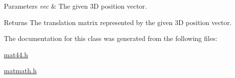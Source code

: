 \begin{DoxyParams}{Parameters}
{\em vec} & The given 3\+D position vector.\\
\hline
\end{DoxyParams}
\begin{DoxyReturn}{Returns}
The translation matrix represented by the given 3\+D position vector. 
\end{DoxyReturn}


The documentation for this class was generated from the following files\+:\begin{DoxyCompactItemize}
\item 
\hyperlink{mat44_8h}{mat44.\+h}\item 
\hyperlink{matmath_8h}{matmath.\+h}\end{DoxyCompactItemize}

